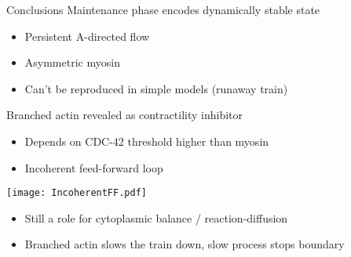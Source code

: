 \documentclass{beamer}
\newcommand{\6}[1]{#1_{\text{6}}}
\newcommand{\3}[1]{#1_{\text{3}}}
\begin{document}
\begin{frame}{Conclusions}
Maintenance phase encodes dynamically stable state
\begin{itemize}
\item Persistent A-directed flow
\item Asymmetric myosin
\item Can't be reproduced in simple models (runaway train)
\end{itemize}
\pause 

Branched actin revealed as contractility inhibitor
\begin{itemize}
\item Depends on CDC-42 threshold higher than myosin
\item Incoherent feed-forward loop
\end{itemize}
\begin{center}
\texttt{[image: IncoherentFF.pdf]}
\end{center}

\pause 
\begin{itemize}
\item Still a role for cytoplasmic balance / reaction-diffusion
\item Branched actin slows the train down, slow process stops boundary
\end{itemize} 
\end{frame}
\end{document}
